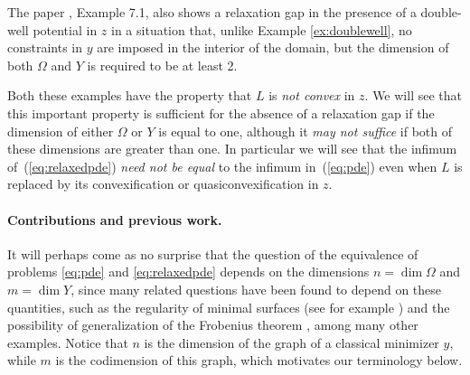 \documentclass{article}
\theoremstyle{definition}
\theoremstyle{remark}
\begin{document}
The paper \cite{fantuzzi2022sharpness}, Example 7.1, also shows a relaxation gap in the presence of a double-well potential in $z$ in a situation that, unlike Example \ref{ex:doublewell}, no constraints in $y$ are imposed in the interior of the domain, but the dimension of both $\Omega$ and $Y$ is required to be at least 2. 

%
Both these examples have the property that $L$ is \emph{not convex} in $z$. We will see that this important property is sufficient for the absence of a relaxation gap if the dimension of either $\Omega$ or $Y$ is equal to one, although it \emph{may not suffice} if both of these dimensions are greater than one. In particular we will see that the infimum of~(\ref{eq:relaxedpde}) \emph{need not be equal} to the infimum in~(\ref{eq:pde}) even when $L$ is replaced by its convexification or quasiconvexification in $z$.
 



\paragraph{Contributions and previous work.}
%

It will perhaps come as no surprise that the question of the equivalence of problems \eqref{eq:pde} and \eqref{eq:relaxedpde} depends on the dimensions $n=\dim \Omega$ and $m=\dim Y$, since many related questions have been found to depend on these quantities, such as the regularity of minimal surfaces (see for example \cite{de2014regularity}) and  the possibility of generalization of the Frobenius theorem \cite{alberti2017some,schioppa2016unrectifiable}, among many other examples. Notice that $n$ is the dimension of the graph of a classical minimizer $y$, while $m$ is the codimension of this graph, which motivates our terminology below.
\end{document}

